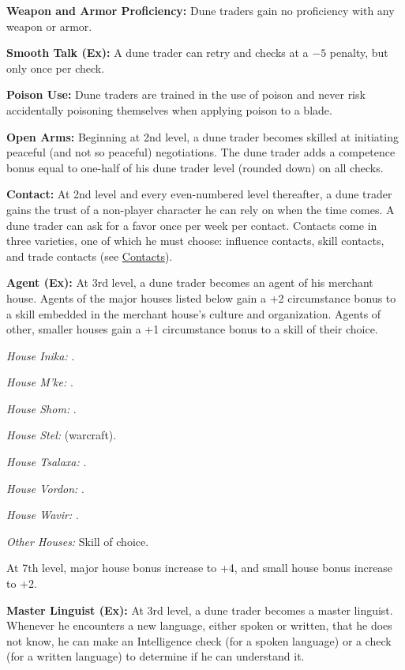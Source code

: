 {

\textbf{Weapon and Armor Proficiency:} Dune traders gain no proficiency with any weapon or armor.

\textbf{Smooth Talk (Ex):} A dune trader can retry  and  checks at a $-5$ penalty, but only once per check.

\textbf{Poison Use:} Dune traders are trained in the use of poison and never risk accidentally poisoning themselves when applying poison to a blade.

\textbf{Open Arms:} Beginning at 2nd level, a dune trader becomes skilled at initiating peaceful (and not so peaceful) negotiations. The dune trader adds a competence bonus equal to one-half of his dune trader level (rounded down) on all  checks.

\textbf{Contact:} At 2nd level and every even-numbered level thereafter, a dune trader gains the trust of a non-player character he can rely on when the time comes. A dune trader can ask for a favor once per week per contact. Contacts come in three varieties, one of which he must choose: influence contacts, skill contacts, and trade contacts (see \hyperref[sec:contacts]{Contacts}).

\textbf{Agent (Ex):} At 3rd level, a dune trader becomes an agent of his merchant house. Agents of the major houses listed below gain a +2 circumstance bonus to a skill embedded in the merchant house's culture and organization. Agents of other, smaller houses gain a +1 circumstance bonus to a skill of their choice.

\textit{House Inika:} .

\textit{House M'ke:} .

\textit{House Shom:} .

\textit{House Stel:}  (warcraft).

\textit{House Tsalaxa:} .

\textit{House Vordon:} .

\textit{House Wavir:} .

\textit{Other Houses:} Skill of choice.

At 7th level, major house bonus increase to +4, and small house bonus increase to +2.

\textbf{Master Linguist (Ex):} At 3rd level, a dune trader becomes a master linguist. Whenever he encounters a new language, either spoken or written, that he does not know, he can make an Intelligence check (for a spoken language) or a  check (for a written language) to determine if he can understand it.

}
